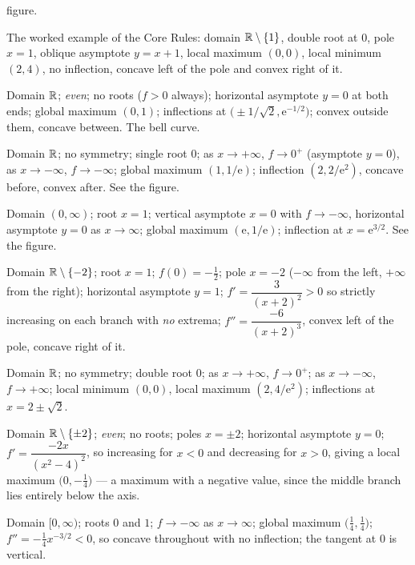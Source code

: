 \begin{solutions}
        figure.
  \item The worked example of the Core Rules: domain $\mathbb{R}\setminus\{1\}$,
        double root at $0$, pole $x=1$, oblique asymptote $y=x+1$, local
        maximum $(0,0)$, local minimum $(2,4)$, no inflection, concave left
        of the pole and convex right of it.
  \item Domain $\mathbb{R}$; \emph{even}; no roots ($f>0$ always); horizontal
        asymptote $y=0$ at both ends; global maximum $(0,1)$; inflections
        at $\bigl(\pm1/\sqrt2,\mathrm{e}^{-1/2}\bigr)$; convex outside
        them, concave between. The bell curve.
  \item Domain $\mathbb{R}$; no symmetry; single root $0$; as $x\to+\infty$,
        $f\to0^{+}$ (asymptote $y=0$), as $x\to-\infty$, $f\to-\infty$;
        global maximum $(1,1/\mathrm{e})$; inflection
        $(2,2/\mathrm{e}^{2})$, concave before, convex after. See the
        figure.
  \item Domain $(0,\infty)$; root $x=1$; vertical asymptote $x=0$ with
        $f\to-\infty$, horizontal asymptote $y=0$ as $x\to\infty$; global
        maximum $(\mathrm{e},1/\mathrm{e})$; inflection at
        $x=\mathrm{e}^{3/2}$. See the figure.
  \item Domain $\mathbb{R}\setminus\{-2\}$; root $x=1$; $f(0)=-\tfrac12$; pole
        $x=-2$ ($-\infty$ from the left, $+\infty$ from the right);
        horizontal asymptote $y=1$; $f'=\dfrac{3}{(x+2)^{2}}>0$ so strictly
        increasing on each branch with \emph{no} extrema;
        $f''=\dfrac{-6}{(x+2)^{3}}$, convex left of the pole, concave right
        of it.
  \item Domain $\mathbb{R}$; no symmetry; double root $0$; as $x\to+\infty$,
        $f\to0^{+}$; as $x\to-\infty$, $f\to+\infty$; local minimum
        $(0,0)$, local maximum $(2,4/\mathrm{e}^{2})$; inflections at
        $x=2\pm\sqrt2$.
  \item Domain $\mathbb{R}\setminus\{\pm2\}$; \emph{even}; no roots; poles
        $x=\pm2$; horizontal asymptote $y=0$;
        $f'=\dfrac{-2x}{(x^{2}-4)^{2}}$, so increasing for $x<0$ and
        decreasing for $x>0$, giving a local maximum
        $\bigl(0,-\tfrac14\bigr)$ --- a maximum with a negative value,
        since the middle branch lies entirely below the axis.
  \item Domain $[0,\infty)$; roots $0$ and $1$; $f\to-\infty$ as
        $x\to\infty$; global maximum $\bigl(\tfrac14,\tfrac14\bigr)$;
        $f''=-\tfrac14x^{-3/2}<0$, so concave throughout with no
        inflection; the tangent at $0$ is vertical.

\end{solutions}
